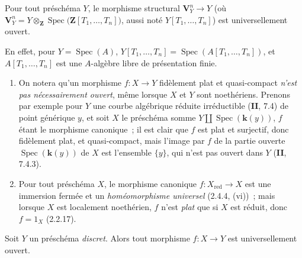 \begin{corollary}[2.4.7]
\label{IV.2.4.7-fr}
Pour tout préschéma $Y$, le morphisme structural $\mathbf V_Y^n\to Y$ \textup{(où}
$\mathbf V_Y^n
=Y\otimes_{\mathbf Z}\operatorname{Spec}
  \bigl(\mathbf Z[T_1,\ldots,T_n]\bigr)$,
\textup{aussi noté $Y[T_1,\ldots,T_n]$)} est universellement ouvert.
\end{corollary}

En effet, pour $Y=\operatorname{Spec}(A)$,
$Y[T_1,\ldots,T_n]=\operatorname{Spec}(A[T_1,\ldots,T_n])$, et
$A[T_1,\ldots,T_n]$ est une $A$-algèbre libre de présentation finie.

\begin{remarks}[2.4.8]
\label{IV.2.4.8-fr}
\begin{enumerate}
\item[(i)] On notera qu'un morphisme $f:X\to Y$ fidèlement plat et
quasi-compact \emph{n'est pas nécessairement ouvert}, même lorsque $X$ et $Y$
sont noethériens. Prenons par exemple pour $Y$ une courbe algébrique réduite
irréductible (\textbf{II}, 7.4) de point générique $y$, et soit $X$ le préschéma somme
$Y\amalg\operatorname{Spec}(\boldsymbol{k}(y))$, $f$ étant le morphisme canonique~; il est
clair que $f$ est plat et surjectif, donc fidèlement plat, et quasi-compact,
mais l'image par $f$ de la partie ouverte $\operatorname{Spec}(\boldsymbol{k}(y))$ de $X$
est l'ensemble $\{y\}$, qui n'est pas ouvert dans $Y$ (\textbf{II}, 7.4.3).
\item[(ii)] Pour tout préschéma $X$, le morphisme canonique
$f:X_{\mathrm{red}}\to X$ est une immersion fermée et un
\emph{homéomorphisme universel} (2.4.4, (vi))~; mais lorsque $X$ est
localement noethérien, $f$ n'est \emph{plat} que si $X$ est réduit, donc
$f=1_X$ (2.2.17).
\end{enumerate}
\end{remarks}

\begin{proposition}[2.4.9]
\label{IV.2.4.9-fr}
Soit $Y$ un préschéma \emph{discret}. Alors tout morphisme $f:X\to Y$ est
universellement ouvert.
\end{proposition}

